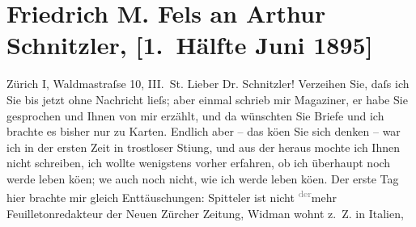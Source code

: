                \section[Friedrich M. Fels an Arthur Schnitzler, {[}1. Hälfte Juni 1895{]}]{ Friedrich M. Fels an Arthur Schnitzler, {[}1. Hälfte Juni 1895{]}}\nopagebreak{}\rehead{ }\begin{ledgroupsized}[t]{13cm}\normalsize\beginnumbering{} \toendnotes[C]{\smallbreak\pagebreak[2]} 
\toendnotes[C]{\smallbreak}\pstart
           \raggedleft{}{\pb}Zürich I, Waldma{\geminationn}straſse 10, III. St.\pend
           \pstart{}Lieber Dr. Schnitzler!\pend\pstart
           Verzeihen Sie, daſs ich Sie bis jetzt ohne Nachricht lieſs; aber einmal schrieb mir
                  Magaziner, er habe Sie gesprochen und Ihnen
               von mir erzählt, und da{\geminationn} wünschten Sie Briefe und \introOben{}ich\introOben{} brachte es bisher nur zu Karten. Endlich aber – das kö{\geminationn}en Sie sich denken – war ich in der ersten Zeit in
               trostloser Sti{\geminationm}ung, und aus der heraus mochte ich Ihnen
               nicht schreiben, ich wollte wenigstens vorher erfahren, ob ich überhaupt noch werde
               leben kö{\geminationn}en; we{\geminationn} auch noch
               nicht, wie ich werde leben kö{\geminationn}en. Der erste Tag hier
               brachte mir gleich Enttäuschungen: Spitteler
               ist nicht \substVorne{}\textsuperscript{\textcolor{gray}{der}}\substDazwischen{}mehr\substHinten{} Feuilletonredakteur der Neuen Zürcher
                  Zeitung, Widman wohnt z. Z. in Italien,

\end{ledgroupsized}
